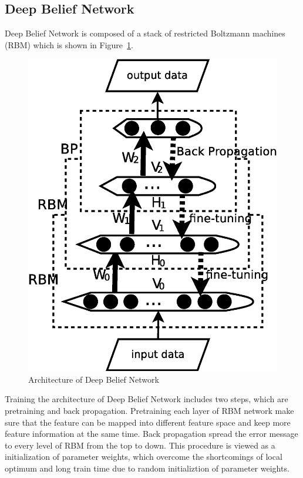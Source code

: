 \documentclass[10pt,twocolumn,letterpaper]{article}
\begin{document}
\subsection{Deep Belief Network}
Deep Belief Network is composed of a stack of
restricted Boltzmann machines (RBM) which is shown in Figure~\ref{fig:DBN}.
\begin{figure}[ht]
\begin{center}
   \includegraphics[width=0.755\linewidth]{DBN.eps}
\end{center}
   \caption{Architecture of Deep Belief Network}
\label{fig:DBN}
\end{figure}
Training the architecture of Deep Belief Network includes two steps, which are pretraining and back propagation. Pretraining each layer of RBM network make sure that the feature can be mapped into different feature space and keep more feature information at the same time. Back propagation spread the error message to every level of RBM from the top to down. This procedure is viewed as a initialization of parameter weights, which overcome the shortcomings of local optimum and long train time due to random initializtion of parameter weights. 
\end{document}
